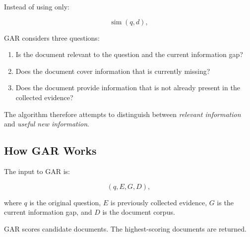 \documentclass[11pt,a4paper]{article}
\begin{document}
Instead of using only:

\[
\operatorname{sim}(q,d),
\]

GAR considers three questions:

\begin{enumerate}[leftmargin=1.5em]
\item Is the document relevant to the question and the current information gap?
\item Does the document cover information that is currently missing?
\item Does the document provide information that is not already present in the collected evidence?
\end{enumerate}

The algorithm therefore attempts to distinguish between \emph{relevant information} and \emph{useful new information}.

\subsection{How GAR Works}

The input to GAR is:

\[
(q,E,G,D),
\]

where $q$ is the original question, $E$ is previously collected evidence, $G$ is the current information gap, and $D$ is the document corpus.

GAR scores candidate documents. The highest-scoring documents are returned.

\begin{center}
\end{center}

\end{document}
